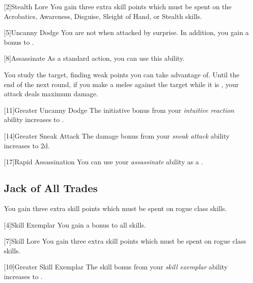         [2]{Stealth Lore} You gain three extra skill points which must be spent on the Acrobatics, Awareness, Disguise, Sleight of Hand, or Stealth skills.

        [5]{Uncanny Dodge}
        You are not \unaware when attacked by surprise.
        In addition, you gain a  bonus to .

        [8]{Assassinate} As a standard action, you can use this ability.
        \begin{ability}
            \begin{spelltargetinginfo}
            \end{spelltargetinginfo}
            \begin{spelleffects}
                \spelleffect You study the target, finding weak points you can take advantage of.
                Until the end of the next round, if you make a melee  against the target while it is \unaware, your attack deals maximum damage.
            \end{spelleffects}
        \end{ability}

        [11]{Greater Uncanny Dodge}
        The initiative bonus from your \textit{intuitive reaction} ability increases to .

        [14]{Greater Sneak Attack}
        The damage bonus from your \textit{sneak attack} ability increases to \plus2d.

        [17]{Rapid Assassination} You can use your \textit{assassinate} ability as a .

    \subsection{Jack of All Trades}

         You gain three extra skill points which must be spent on rogue class skills.

        [4]{Skill Exemplar} You gain a  bonus to all skills.

        [7]{Skill Lore} You gain three extra skill points which must be spent on rogue class skills.

        [10]{Greater Skill Exemplar} The skill bonus from your \textit{skill exemplar} ability increases to .

